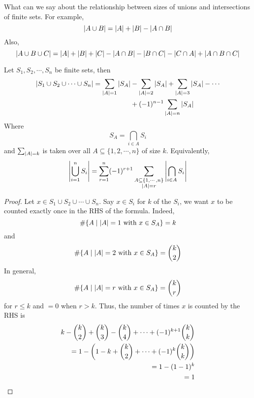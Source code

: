\documentclass{article}
\begin{document}
\begin{question}
    What can we say about the relationship between sizes of unions and intersections of finite sets.
    For example,
    \[
        \left\lvert A \cup B\right\rvert = \left\lvert A\right\rvert + \left\lvert B\right\rvert - \left\lvert A \cap B\right\rvert  
    \]
    Also,
    \[
        \left\lvert A \cup B \cup C\right\rvert = \left\lvert A\right\rvert + \left\lvert B\right\rvert + \left\lvert C\right\rvert - \left\lvert A \cap B\right\rvert - \left\lvert B \cap C\right\rvert- \left\lvert C \cap A\right\rvert + \left\lvert A \cap B \cap C\right\rvert  
    \]
\end{question}

\begin{nthm}\label{th:4-4}
    Let $S_1, S_2, \cdots, S_n$ be finite sets, then
    \begin{align*}
        \left\lvert S_1 \cup S_2 \cup \cdots \cup S_n\right\rvert = \sum_{\left\lvert A\right\rvert = 1} \left\lvert S_A\right\rvert &- \sum_{\left\lvert A\right\rvert = 2} \left\lvert S_A\right\rvert + \sum_{\left\lvert A\right\rvert = 3} \left\lvert S_A\right\rvert - \cdots \\ 
        &+ (-1)^{n-1} \sum_{\left\lvert A\right\rvert = n} \left\lvert S_A\right\rvert
    \end{align*}
    Where
    \[
        S_A = \bigcap_{i \in A} S_i  
    \]
    and $\sum_{\left\lvert A\right\rvert = k}$ is taken over all $A \subseteq \{1, 2, \cdots, n\}$ of size $k$.
    Equivalently,
    \[
        \left\lvert \bigcup_{i=1}^n S_i\right\rvert = \sum_{r = 1}^n (-1)^{r + 1} \sum_{\substack{
            A \subseteq \{1, \cdots, n\} \\ 
            \left\lvert A\right\rvert = r
        }} \left\lvert \bigcap_{i \in A} S_i\right\rvert 
    \]
\end{nthm}
\begin{proof}
    Let $x \in S_1 \cup S_2 \cup \cdots \cup S_n$. 
    Say $x \in S_i$ for $k$ of the $S_i$, we want $x$ to be counted exactly once in the RHS of the formula.
    Indeed,
    \[
        \#\{A \mid \left\lvert A\right\rvert = 1 \text{ with } x \in S_A\} = k  
    \]
    and
    \[
        \#\{A \mid \left\lvert A\right\rvert = 2 \text{ with } x \in S_A\} = \binom{k}{2}  
    \]
    In general,
    \[
        \#\{A \mid \left\lvert A\right\rvert = r \text{ with } x \in S_A\} = \binom{k}{r}
    \]
    for $r \leq k$ and $=0$ when $r > k$.
    Thus, the number of times $x$ is counted by the RHS is
    \begin{align*}
        k - \binom{k}{2} + \binom{k}{3} - \binom{k}{4} + \cdots + (-1)^{k+1} \binom{k}{k} \\
        = 1 - \left( 1 - k + \binom{k}{2} + \cdots + (-1)^k \binom{k}{k} \right) \\
        = 1 - (1 - 1)^k \\
        = 1
    \end{align*}
\end{proof}
\end{document}
